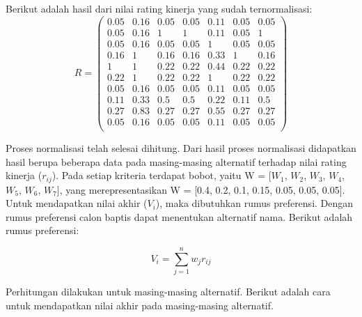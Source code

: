 Berikut adalah hasil dari nilai rating kinerja yang sudah ternormalisasi:
\begin{displaymath} R = 
\left (
\begin{array}{rrrrrrr}
0.05 & 0.16 & 0.05 & 0.05 & 0.11 & 0.05 & 0.05\\		
0.05 & 0.16 & 1 & 1 & 0.11 & 0.05 & 1\\
0.05 & 0.16 & 0.05 & 0.05 & 1 & 0.05 &0.05\\
0.16 & 1 & 0.16 & 0.16 & 0.33 & 1 & 0.16\\
1 & 1 & 0.22 & 0.22 & 0.44 & 0.22 & 0.22\\
0.22 & 1 & 0.22 & 0.22 & 1 & 0.22 & 0.22\\
0.05 & 0.16 & 0.05 & 0.05 & 0.11 &0.05 & 0.05\\
0.11 & 0.33 & 0.5 & 0.5 & 0.22 & 0.11 & 0.5\\
0.27 & 0.83 & 0.27 & 0.27 & 0.55 & 0.27 & 0.27\\
0.05 & 0.16 & 0.05 & 0.05 & 0.11 & 0.05 & 0.05\\
			\end{array}\right )	
	\end{displaymath}

Proses normalisasi telah selesai dihitung. Dari hasil proses normalisasi didapatkan hasil berupa beberapa data pada masing-masing alternatif terhadap nilai rating kinerja ($r_{ij}$). Pada setiap kriteria terdapat bobot, yaitu W = [$W_{1}$, $W_{2}$, $W_{3}$, $W_{4}$, $W_{5}$, $W_{6}$, $W_{7}$], yang merepresentasikan W = [0.4, 0.2, 0.1, 0.15, 0.05, 0.05, 0.05]. Untuk mendapatkan nilai akhir ($V_{i}$), maka dibutuhkan rumus preferensi. Dengan rumus preferensi calon baptis dapat menentukan alternatif nama. Berikut adalah rumus preferensi:

\[
 V_{i} =\displaystyle\sum_{j=1}^{n} w_{j} r_{ij}
\]


Perhitungan dilakukan untuk masing-masing alternatif. Berikut adalah cara untuk mendapatkan nilai akhir pada masing-masing alternatif.

